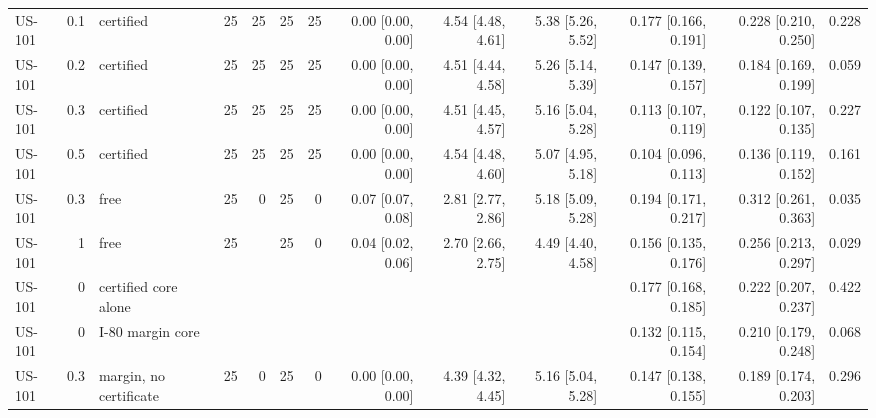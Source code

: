 \begin{table}[htbp]
{\begin{tabular}{lrlrrrrrrrrrr}
US-101 & 0.1 & certified & 25 & 25 & 25 & 25 & 0.00 [0.00, 0.00] & 4.54 [4.48, 4.61] & 5.38 [5.26, 5.52] & 0.177 [0.166, 0.191] & 0.228 [0.210, 0.250] & 0.228 \\
US-101 & 0.2 & certified & 25 & 25 & 25 & 25 & 0.00 [0.00, 0.00] & 4.51 [4.44, 4.58] & 5.26 [5.14, 5.39] & 0.147 [0.139, 0.157] & 0.184 [0.169, 0.199] & 0.059 \\
US-101 & 0.3 & certified & 25 & 25 & 25 & 25 & 0.00 [0.00, 0.00] & 4.51 [4.45, 4.57] & 5.16 [5.04, 5.28] & 0.113 [0.107, 0.119] & 0.122 [0.107, 0.135] & 0.227 \\
US-101 & 0.5 & certified & 25 & 25 & 25 & 25 & 0.00 [0.00, 0.00] & 4.54 [4.48, 4.60] & 5.07 [4.95, 5.18] & 0.104 [0.096, 0.113] & 0.136 [0.119, 0.152] & 0.161 \\
US-101 & 0.3 & free & 25 & 0 & 25 & 0 & 0.07 [0.07, 0.08] & 2.81 [2.77, 2.86] & 5.18 [5.09, 5.28] & 0.194 [0.171, 0.217] & 0.312 [0.261, 0.363] & 0.035 \\
US-101 & 1 & free & 25 &  & 25 & 0 & 0.04 [0.02, 0.06] & 2.70 [2.66, 2.75] & 4.49 [4.40, 4.58] & 0.156 [0.135, 0.176] & 0.256 [0.213, 0.297] & 0.029 \\
US-101 & 0 & certified core alone &  &  &  &  &  &  &  & 0.177 [0.168, 0.185] & 0.222 [0.207, 0.237] & 0.422 \\
US-101 & 0 & I-80 margin core &  &  &  &  &  &  &  & 0.132 [0.115, 0.154] & 0.210 [0.179, 0.248] & 0.068 \\
US-101 & 0.3 & margin, no certificate & 25 & 0 & 25 & 0 & 0.00 [0.00, 0.00] & 4.39 [4.32, 4.45] & 5.16 [5.04, 5.28] & 0.147 [0.138, 0.155] & 0.189 [0.174, 0.203] & 0.296 \\
\bottomrule
\end{tabular}
}
\end{table}
